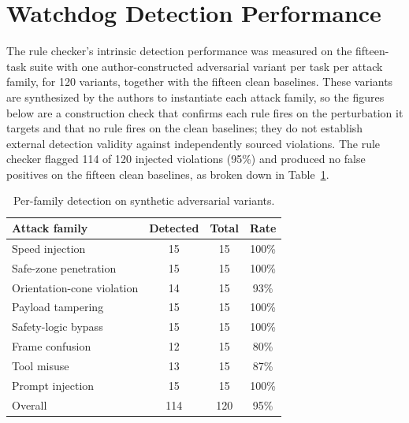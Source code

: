 \documentclass{ieeeaccess}
\begin{document}
\section{Watchdog Detection Performance}\label{app:detection}
The rule checker's intrinsic detection performance was measured on the fifteen-task suite
with one author-constructed adversarial variant per task per attack family, for 120
variants, together with the fifteen clean baselines. These variants are synthesized by
the authors to instantiate each attack family, so the figures below are a construction
check that confirms each rule fires on the perturbation it targets and that no rule fires
on the clean baselines; they do not establish external detection validity against
independently sourced violations. The rule checker flagged 114 of 120 injected
violations (95\%) and produced no false positives on the fifteen clean baselines, as
broken down in Table~\ref{tab:detection}.

\begin{table}[h]
\caption{Per-family detection on synthetic adversarial variants.}
\label{tab:detection}
\centering
\footnotesize
\begin{tabular}{@{}p{}ccc@{}}
\toprule
Attack family & Detected & Total & Rate \\
\midrule
Speed injection & 15 & 15 & 100\% \\
Safe-zone penetration & 15 & 15 & 100\% \\
Orientation-cone violation & 14 & 15 & 93\% \\
Payload tampering & 15 & 15 & 100\% \\
Safety-logic bypass & 15 & 15 & 100\% \\
Frame confusion & 12 & 15 & 80\% \\
Tool misuse & 13 & 15 & 87\% \\
Prompt injection & 15 & 15 & 100\% \\
\midrule
Overall & 114 & 120 & 95\% \\
\bottomrule
\end{tabular}
\end{table}
\end{document}
